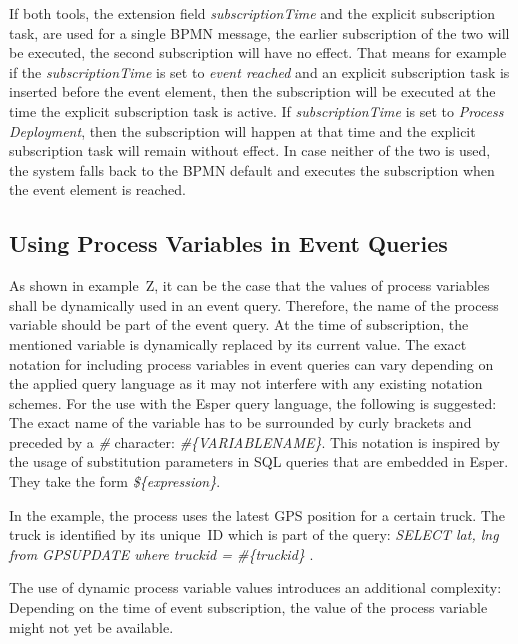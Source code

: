 If both tools, the extension field \textit{subscriptionTime} and the explicit subscription task, are used for a single BPMN message, the earlier subscription of the two will be executed, the second subscription will have no effect.
That means for example if the \textit{subscriptionTime} is set to \textit{event reached} and an explicit subscription task is inserted before the event element, then the subscription will be executed at the time the explicit subscription task is active.
If \textit{subscriptionTime} is set to \textit{Process Deployment}, then the subscription will happen at that time and the explicit subscription task will remain without effect.
In case neither of the two is used, the system falls back to the BPMN default and executes the subscription when the event element is reached.

\subsection{Using Process Variables in Event Queries}



As shown in example~Z, it can be the case that the values of process variables shall be dynamically used in an event query.
Therefore, the name of the process variable should be part of the event query. At the time of subscription, the mentioned variable is dynamically replaced by its current value.
The exact notation for including process variables in event queries can vary depending on the applied query language as it may not interfere with any existing notation schemes.
For the use with the Esper query language, the following is suggested: The exact name of the variable has to be surrounded by curly brackets and preceded by a \textit{\#} character: \textit{\#\{VARIABLENAME\}}.
This notation is inspired by the usage of substitution parameters in SQL queries that are embedded in Esper. They take the form \textit{\$\{expression\}}.

In the example, the process uses the latest GPS position for a certain truck. The truck is identified by its unique~ID which is part of the query: \textit{SELECT lat, lng from GPSUPDATE where truckid = \#\{truckid\} }.

The use of dynamic process variable values introduces an additional complexity: Depending on the time of event subscription, the value of the process variable might not yet be available.



